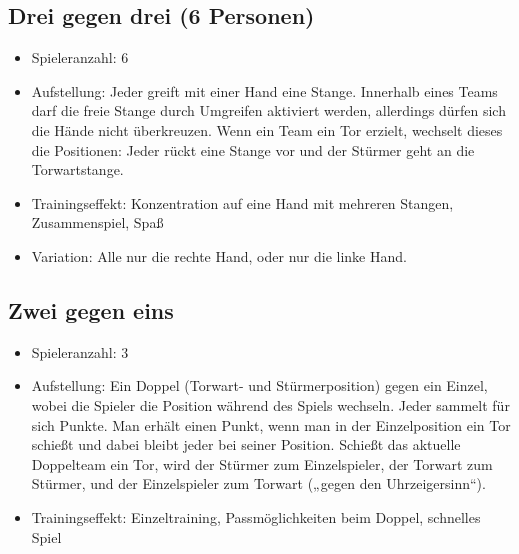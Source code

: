 \subsection{Drei gegen drei (6 Personen)}
\label{spielformen:npersonen:dreigegendrei}

\begin{itemize}
\item Spieleranzahl: 6
\item Aufstellung: Jeder greift mit einer Hand eine Stange.
Innerhalb eines Teams darf die freie Stange durch Umgreifen aktiviert werden, allerdings
dürfen sich die Hände nicht überkreuzen.
Wenn ein Team ein Tor erzielt, wechselt dieses die Positionen: Jeder rückt
eine Stange vor und der Stürmer geht an die Torwartstange.
\item Trainingseffekt: Konzentration auf eine Hand mit mehreren Stangen, Zusammenspiel, Spaß
\item Variation: Alle nur die rechte Hand, oder nur die linke Hand. 
\end{itemize}

\subsection{Zwei gegen eins}
\label{spielformen:npersonen:jedergegenjeden}

\begin{itemize}
\item Spieleranzahl:  3
\item Aufstellung: Ein Doppel (Torwart- und Stürmerposition) gegen ein Einzel, wobei die Spieler die Position während des Spiels wechseln.
Jeder sammelt für sich Punkte. Man erhält einen Punkt, wenn man in der
Einzelposition ein Tor schießt und dabei bleibt jeder bei seiner Position. 
Schießt das
aktuelle Doppelteam ein Tor, wird der Stürmer zum Einzelspieler, der Torwart zum
Stürmer, und der Einzelspieler zum Torwart („gegen den Uhrzeigersinn“).
\item Trainingseffekt: Einzeltraining, Passmöglichkeiten beim Doppel, schnelles Spiel
\end{itemize}


